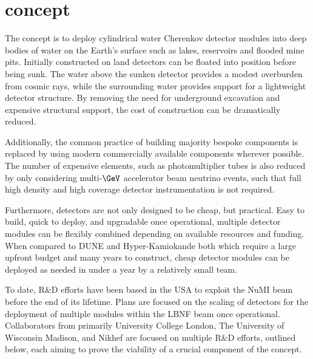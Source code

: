 \section{\chips concept} %
\label{sec:chips_concept} %

The \chips concept is to deploy cylindrical water Cherenkov detector modules into deep bodies of
water on the Earth's surface such as lakes, reservoirs and flooded mine pits. Initially
constructed on land \chips detectors can be floated into position before being sunk. The water
above the sunken detector provides a modest overburden from cosmic rays, while the surrounding
water provides support for a lightweight detector structure. By removing the need for underground
excavation and expensive structural support, the cost of construction can be dramatically reduced.

Additionally, the common practice of building majority bespoke components is replaced by using
modern commercially available components wherever possible. The number of expensive elements, such
as photomultiplier tubes is also reduced by only considering multi-$\GeV$ accelerator beam
neutrino events, such that full high density and high coverage detector instrumentation is not
required.

Furthermore, \chips detectors are not only designed to be cheap, but practical. Easy to build,
quick to deploy, and upgradable once operational, multiple detector modules can be flexibly
combined depending on available resources and funding. When compared to DUNE and Hyper-Kamiokande
both which require a large upfront budget and many years to construct, cheap \chips detector
modules can be deployed as needed in under a year by a relatively small team.

To date, \chips R\&D efforts have been based in the USA to exploit the NuMI beam before the end of
its lifetime. Plans are focused on the scaling of \chips detectors for the deployment of multiple
modules within the LBNF beam once operational. Collaborators from primarily University College
London, The University of Wisconsin Madison, and Nikhef are focused on multiple R\&D efforts,
outlined below, each aiming to prove the viability of a crucial component of the \chips concept.

